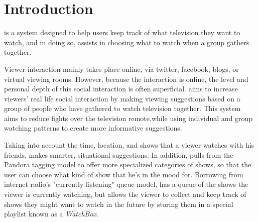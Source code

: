 \section{Introduction}

{\sys} is a system designed to help users keep track of what
television they want to watch, and in doing so, assists in choosing what
to watch when a group gathers together.

Viewer interaction mainly takes place online, via twitter, facebook, blogs,
or virtual viewing rooms.  However, because the interaction is online, the level and personal depth of
this social interaction is often superficial.  {\sys} aims to increase viewers' real life social interaction by making viewing suggestions based on a group of people who have gathered to watch television together. This system aims to reduce fights over the television remote,while using individual and group watching patterns to create more informative suggestions.

Taking into account the time, location, and shows that a viewer watches with
his friends, {\sys} makes smarter, situational suggestions.  In
addition, {\sys} pulls from the Pandora tagging model to offer more
specialized categories of shows, so that the user can choose what kind
of show that he's in the mood for.  Borrowing from internet radio's
"currently listening" queue model, {\sys} has a queue of the shows
the viewer is currently watching, but allows the viewer to collect and keep
track of shows they might want to watch in the future by storing them
in a special playlist known as a \emph{WatchBox}.  
